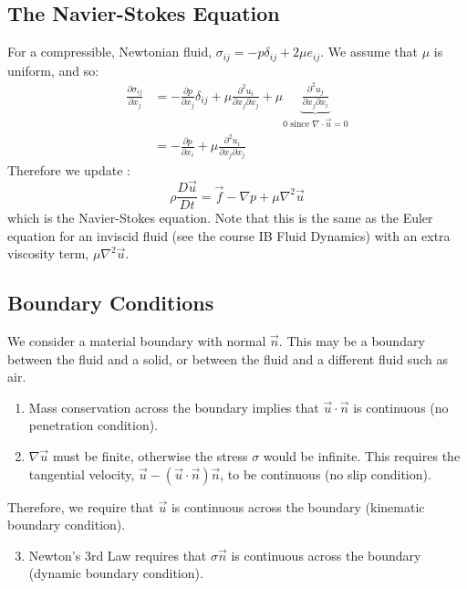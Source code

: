 \documentclass[../Main.tex]{subfiles}
\begin{document}
\subsection{The Navier-Stokes Equation}
For a compressible, Newtonian fluid, $\sigma_{ij} = -p\delta_{ij} + 2 \mu e_{ij}$. We assume that $\mu$ is uniform, and so:
\begin{align*}
    \frac{\partial \sigma_{ij}}{\partial x_j} &= -\frac{\partial p}{\partial x_j} \delta_{ij} + \mu \frac{\partial^{2}u_i}{\partial x_j\partial x_j} + \mu \underbrace{\frac{\partial^{2}u_j}{\partial x_j\partial x_i}}_{0 \text{ since } \nabla \cdot \vec{u} = 0} \\
    &= -\frac{\partial p}{\partial x_i} + \mu \frac{\partial^{2}u_i}{\partial x_j\partial x_j}
\end{align*}
Therefore we update :
\begin{equation}
    \rho \frac{D \vec{u}}{D t} = \vec{f} - \nabla p + \mu \nabla^2 \vec{u}
    \label{eqnNavierStokes}
\end{equation}
which is the Navier-Stokes equation. Note that this is the same as the Euler equation for an inviscid fluid (see the course IB Fluid Dynamics) with an extra viscosity term, $\mu \nabla^2 \vec{u}$.
\subsection{Boundary Conditions}
We consider a material boundary with normal $\vec{n}$. This may be a boundary between the fluid and a solid, or between the fluid and a different fluid such as air.

\begin{enumerate}
    \item Mass conservation across the boundary implies that $\vec{u} \cdot \vec{n}$ is continuous (no penetration condition).
    \item $\nabla \vec{u}$ must be finite, otherwise the stress $\sigma$ would be infinite. This requires the tangential velocity, $\vec{u} - (\vec{u} \cdot \vec{n})\vec{n}$, to be continuous (no slip condition).
\end{enumerate}
Therefore, we require that $\vec{u}$ is continuous across the boundary (kinematic boundary condition).
\begin{enumerate}
    \setcounter{enumi}{2}
    \item Newton's 3rd Law requires that $\sigma\vec{n}$ is continuous across the boundary (dynamic boundary condition).
\end{enumerate}
\end{document}
